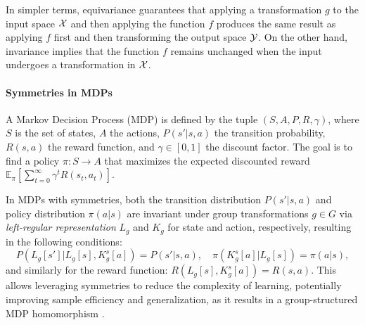 In simpler terms, equivariance guarantees that applying a transformation $g$ to the input space ${\mathcal{X}}$ and then applying the function $f$ produces the same result as applying $f$ first and then transforming the output space ${\mathcal{Y}}$. On the other hand, invariance implies that the function $f$ remains unchanged when the input undergoes a transformation in ${\mathcal{X}}$.

\paragraph{Symmetries in MDPs}
A Markov Decision Process (MDP) is defined by the tuple $(S, A, P, R, \gamma)$, where $S$ is the set of states, $A$ the actions, $P(s'|s,a)$ the transition probability, $R(s,a)$ the reward function, and $\gamma \in [0,1]$ the discount factor. The goal is to find a policy $\pi: S \to A$ that maximizes the expected discounted reward $\mathbb{E}_\pi[\sum_{t=0}^\infty \gamma^t R(s_t, a_t)]$.

In MDPs with symmetries, both the transition distribution $P(s'|s,a)$ and policy distribution $\pi(a|s)$ are invariant under group transformations $g \in G$ via \emph{left-regular representation} $L_g$ and $K_g$ for state and action, respectively, resulting in the following conditions:
\[
P(L_g[s']|L_g[s], K_g^s[a]) = P(s'|s,a), \quad \pi(K_g^s[a]|L_g[s]) = \pi(a|s),
\]
and similarly for the reward function: $R(L_g[s], K_g^s[a]) = R(s, a)$. This allows leveraging symmetries to reduce the complexity of learning, potentially improving sample efficiency and generalization, as it results in a group-structured MDP homomorphism \citep{van2020mdp}.



